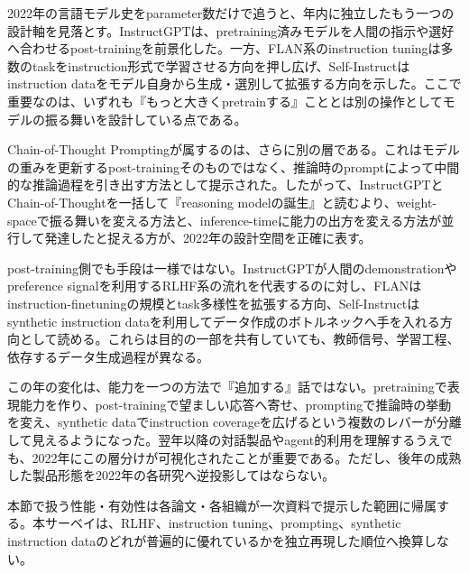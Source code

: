 
2022年の言語モデル史をparameter数だけで追うと、年内に独立したもう一つの設計軸を見落とす。InstructGPTは、pretraining済みモデルを人間の指示や選好へ合わせるpost-trainingを前景化した。一方、FLAN系のinstruction tuningは多数のtaskをinstruction形式で学習させる方向を押し広げ、Self-Instructはinstruction dataをモデル自身から生成・選別して拡張する方向を示した。ここで重要なのは、いずれも『もっと大きくpretrainする』こととは別の操作としてモデルの振る舞いを設計している点である。\autocite{src-0c551201e765,src-87477ad8b476,src-e58f1e9c8754,src-fadb2b92c538}


Chain-of-Thought Promptingが属するのは、さらに別の層である。これはモデルの重みを更新するpost-trainingそのものではなく、推論時のpromptによって中間的な推論過程を引き出す方法として提示された。したがって、InstructGPTとChain-of-Thoughtを一括して『reasoning modelの誕生』と読むより、weight-spaceで振る舞いを変える方法と、inference-timeに能力の出方を変える方法が並行して発達したと捉える方が、2022年の設計空間を正確に表す。\autocite{src-87477ad8b476,src-a17359c66f6b,src-e58f1e9c8754}


post-training側でも手段は一様ではない。InstructGPTが人間のdemonstrationやpreference signalを利用するRLHF系の流れを代表するのに対し、FLANはinstruction-finetuningの規模とtask多様性を拡張する方向、Self-Instructはsynthetic instruction dataを利用してデータ作成のボトルネックへ手を入れる方向として読める。これらは目的の一部を共有していても、教師信号、学習工程、依存するデータ生成過程が異なる。\autocite{src-0c551201e765,src-87477ad8b476,src-e58f1e9c8754,src-fadb2b92c538}


この年の変化は、能力を一つの方法で『追加する』話ではない。pretrainingで表現能力を作り、post-trainingで望ましい応答へ寄せ、promptingで推論時の挙動を変え、synthetic dataでinstruction coverageを広げるという複数のレバーが分離して見えるようになった。翌年以降の対話製品やagent的利用を理解するうえでも、2022年にこの層分けが可視化されたことが重要である。ただし、後年の成熟した製品形態を2022年の各研究へ逆投影してはならない。\autocite{src-0c551201e765,src-87477ad8b476,src-a17359c66f6b,src-e58f1e9c8754,src-fadb2b92c538}


\begin{claimboundary}
本節で扱う性能・有効性は各論文・各組織が一次資料で提示した範囲に帰属する。本サーベイは、RLHF、instruction tuning、prompting、synthetic instruction dataのどれが普遍的に優れているかを独立再現した順位へ換算しない。\autocite{src-87477ad8b476,src-a17359c66f6b,src-e58f1e9c8754}
\end{claimboundary}
